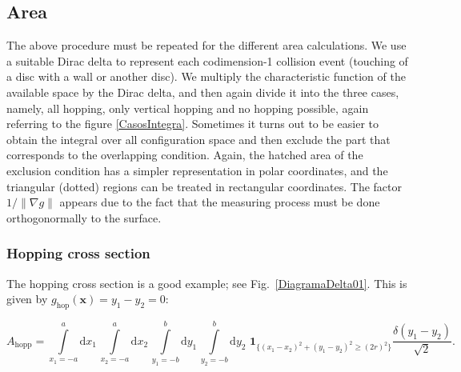 \documentclass[superscriptaddress,pre,reprint,showpacs,onecolumn]{revtex4-1}
\newcommand{\rd}[1]{\mathrm{d}{#1} \,}
\newcommand{\indicatorsymbol}{\mathbf{1}}
\newcommand{\indicator}[1]{\indicatorsymbol_{ \{   #1 \} } }
\begin{document}
\subsection{Area}

The above procedure must be repeated for the different
area calculations. We use a suitable Dirac delta to represent each codimension-1 collision
event (touching of a disc with a wall or another disc). We multiply the characteristic function of the available space by the Dirac delta, and
then again divide it into the three cases, namely, all hopping, only vertical hopping
and no hopping possible, again referring to the figure \ref{CasosIntegra}.
Sometimes it turns out to be easier to obtain 
the integral  over all configuration space and then exclude the part that
corresponds to the overlapping condition. Again, the hatched area of the exclusion
condition has a simpler representation in polar coordinates, and the triangular
(dotted) regions can be treated in rectangular coordinates.
%
The factor $1/ {\| \nabla g \|}$ appears due to the fact
that the measuring process must be done orthogonormally to the surface. 

\subsubsection{Hopping cross section}

The hopping cross section is a good example; see Fig.~\ref{DiagramaDelta01}. 
This is given by $g_\text{hop}(\mathbf{x}) = y_1 - y_2 = 0$:
\begin{widetext}\label{ahopcart}
\begin{equation}
 A_\text{hopp} = \int \limits_{x_1 = -a}^a \rd {x_1} \int\limits_{x_2 = -a}^a \rd {x_2}
\int\limits_{y_1 = -b}^b \rd {y_1} \int\limits_{y_2 = -b}^b \rd {y_2} \, \indicator{ (x_1-x_2)^2 + (y_1-y_2)^2 \ge (2r)^2 } \frac{\delta(y_1-y_2)}{\sqrt{2}}.
\end{equation}
\end{widetext}
\end{document}
